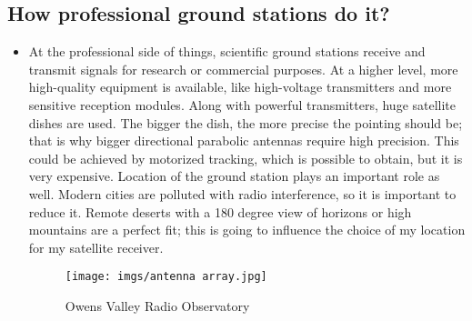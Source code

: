 \documentclass{article}
\begin{document}
    \subsection{How professional ground stations do it?}
        \begin{itemize}
            \item[] At the professional side of things, scientific ground stations receive and transmit signals for research or commercial purposes. At a higher level, more high-quality equipment is available, like high-voltage transmitters and more sensitive reception modules. Along with powerful transmitters, huge satellite dishes are used. The bigger the dish, the more precise the pointing should be; that is why bigger directional parabolic antennas require high precision. This could be achieved by motorized tracking, which is possible to obtain, but it is very expensive. Location of the ground station plays an important role as well. Modern cities are polluted with radio interference, so it is important to reduce it. Remote deserts with a 180 degree view of horizons or high mountains are a perfect fit; this is going to influence the choice of my location for my satellite receiver. 



            \begin{figure}[H]
                \centering
                \texttt{[image: imgs/antenna array.jpg]}
                \caption{Owens Valley Radio Observatory \cite{9}}
                \label{dish-array-img}
            \end{figure}
            
        \end{itemize}
\end{document}
